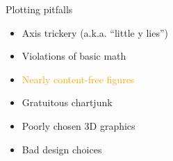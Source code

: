 \documentclass[
  ignorenonframetext,
]{beamer}
\providecommand{\tightlist}{%
  \setlength{\itemsep}{0pt}\setlength{\parskip}{0pt}}
\begin{document}
\begin{frame}{}
\label{section-14}
\end{frame}

\begin{frame}{Plotting pitfalls}
\label{plotting-pitfalls-2}
\begin{itemize}
\tightlist
\item
  Axis trickery (a.k.a. ``little y lies'')
\item
  Violations of basic math
\item
  \textcolor{orange}{Nearly content-free figures}
\item
  Gratuitous chartjunk
\item
  Poorly chosen 3D graphics
\item
  Bad design choices
\end{itemize}
\end{frame}

\begin{frame}{}
\label{section-15}
\end{frame}
\end{document}
